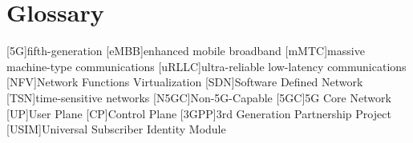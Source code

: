 \chapter{Glossary}

\footnotesize
\SingleSpacing

\begin{acronym}[AAAAAA]

	[5G]{fifth-generation}
	[eMBB]{enhanced mobile broadband}
	[mMTC]{massive machine-type communications}
	[uRLLC]{ultra-reliable low-latency communications}
	[NFV]{Network Functions Virtualization}
	[SDN]{Software Defined Network}
	[TSN]{time-sensitive networks}
	[N5GC]{Non-5G-Capable}
	[5GC]{5G Core Network}
	[UP]{User Plane}
	[CP]{Control Plane}
	[3GPP]{3rd Generation Partnership Project}
	[USIM]{Universal Subscriber Identity Module}

\end{acronym}

